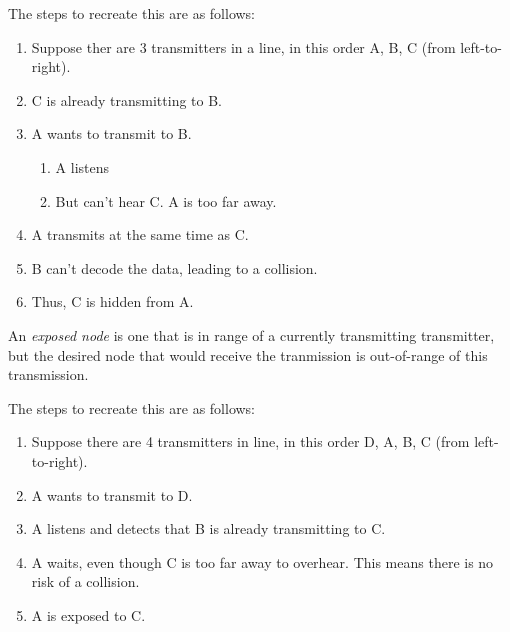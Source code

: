 The steps to recreate this are as follows:
\begin{enumerate}[noitemsep]
\item Suppose ther are 3 transmitters in a line, in this order A, B, C (from left-to-right).
\item C is already transmitting to B.
\item A wants to transmit to B.
  \begin{enumerate}[noitemsep]
  \item A listens
  \item But can't hear C. A is too far away.
  \end{enumerate}

\item A transmits at the same time as C.
\item B can't decode the data, leading to a collision.
\item Thus, C is hidden from A.
\end{enumerate}

\begin{definition}\label{def:Exposed_Node}
  An \emph{exposed node} is one that is in range of a currently transmitting transmitter, but the desired node that would receive the tranmission is out-of-range of this transmission.
\end{definition}

The steps to recreate this are as follows:
\begin{enumerate}[noitemsep]
\item Suppose there are 4 transmitters in line, in this order D, A, B, C (from left-to-right).
\item A wants to transmit to D.
\item A listens and detects that B is already transmitting to C.
\item A waits, even though C is too far away to overhear. This means there is no risk of a collision.
\item A is exposed to C.
\end{enumerate}

